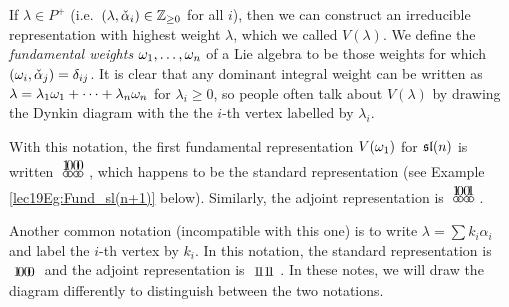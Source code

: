  \setcounter{lecture}{19}

 If $\lambda\in P^+$ (i.e.\ $(\lambda, \check \alpha_i)\in \ZZ_{\ge 0}$ for all $i$),
 then we can construct an irreducible representation with highest weight $\lambda$,
 which we called $V(\lambda)$. We define the \emph{fundamental
 weights} $\w_1,\dots, \w_n$ of a Lie algebra to be
 those weights for which $(\w_i,\check \alpha_j)=\delta_{ij}$. It is clear that any
 dominant integral weight can be written as $\lambda = \lambda_1\w_1+\cdots +
 \lambda_n \w_n$ for $\lambda_i\ge 0$, so people often talk about $V(\lambda)$ by
 drawing the Dynkin diagram with the the $i$-th vertex labelled by $\lambda_i$.

 With this notation, the first fundamental representation $V(\w_1)$ for $\sl(n)$ is written
  $\begin{xy}
   (0,-.15) *+!D{1} *\cir<2pt>{};
   p+(1,0) *+!D{0} *\cir<2pt>{} **@{-};
   p+(.5,0) **@{-};
   p+(.6,0) **{\hspace{1pt}.\hspace{1pt}};
   p+(.5,0) *+!D{0} *\cir<2pt>{} **@{-};
   p+(1,0) *+!D{0} *\cir<2pt>{} **@{-};
 \end{xy}$, which happens to be the standard representation
 (see Example \ref{lec19Eg:Fund_sl(n+1)} below).
 Similarly, the adjoint representation is
 $\begin{xy}
   (0,-.15) *+!D{1} *\cir<2pt>{};
   p+(1,0) *+!D{0} *\cir<2pt>{} **@{-};
   p+(.5,0) **@{-};
   p+(.6,0) **{\hspace{1pt}.\hspace{1pt}};
   p+(.5,0) *+!D{0} *\cir<2pt>{} **@{-};
   p+(1,0) *+!D{1} *\cir<2pt>{} **@{-};
 \end{xy}$.
 \begin{warning}
   Another common notation (incompatible with this one) is to write $\lambda = \sum
   k_i\alpha_i$ and label the $i$-th vertex by $k_i$. In this notation, the standard
   representation is
   $\begin{xy}
   (0,0) *+{1};
   p+(1,0) *+{0} **@{-};
   p+(.5,0) **@{-};
   p+(.6,0) **{\hspace{1pt}.\hspace{1pt}};
   p+(.5,0) *+{0} **@{-};
   p+(1,0) *+{0} **@{-};
 \end{xy}$
 and the adjoint representation is
 $\begin{xy}
   (0,0) *+{1};
   p+(1,0) *+{1} **@{-};
   p+(.5,0) **@{-};
   p+(.6,0) **{\hspace{1pt}.\hspace{1pt}};
   p+(.5,0) *+{1} **@{-};
   p+(1,0) *+{1} **@{-};
 \end{xy}$. In these notes, we will draw the diagram differently to distinguish
 between the two notations.
 \end{warning}

